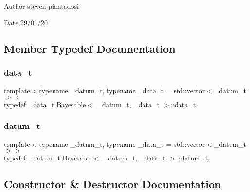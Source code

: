 \begin{DoxyAuthor}{Author}
steven piantadosi 
\end{DoxyAuthor}
\begin{DoxyDate}{Date}
29/01/20 
\end{DoxyDate}


\subsection{Member Typedef Documentation}
\mbox{\label{class_bayesable_aa2788c4d7718c0a824e1d28c4c98f921}} 
\subsubsection{\texorpdfstring{data\+\_\+t}{data\_t}}
{\footnotesize\ttfamily template$<$typename \+\_\+datum\+\_\+t, typename \+\_\+data\+\_\+t = std\+::vector$<$\+\_\+datum\+\_\+t$>$$>$ \\
typedef \+\_\+data\+\_\+t \hyperlink{class_bayesable}{Bayesable}$<$ \+\_\+datum\+\_\+t, \+\_\+data\+\_\+t $>$\+::\hyperlink{class_bayesable_aa2788c4d7718c0a824e1d28c4c98f921}{data\+\_\+t}}

\mbox{\label{class_bayesable_a9f1a6c0cd7855550fa10b1a8f13a5867}} 
\subsubsection{\texorpdfstring{datum\+\_\+t}{datum\_t}}
{\footnotesize\ttfamily template$<$typename \+\_\+datum\+\_\+t, typename \+\_\+data\+\_\+t = std\+::vector$<$\+\_\+datum\+\_\+t$>$$>$ \\
typedef \+\_\+datum\+\_\+t \hyperlink{class_bayesable}{Bayesable}$<$ \+\_\+datum\+\_\+t, \+\_\+data\+\_\+t $>$\+::\hyperlink{class_bayesable_a9f1a6c0cd7855550fa10b1a8f13a5867}{datum\+\_\+t}}



\subsection{Constructor \& Destructor Documentation}
\mbox{\label{class_bayesable_aec41e7016c9c1eb6978e1360c23f20cd}} 
